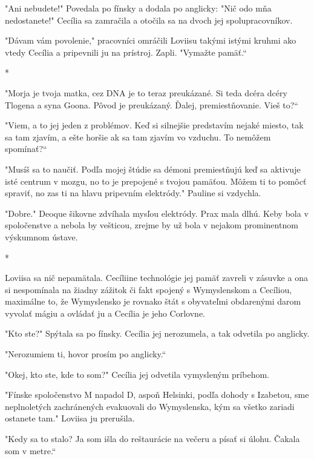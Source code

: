 \documentclass{book}
\begin{document}
"$ $Ani nebudete!"$ $ Povedala po fínsky a dodala po anglicky: "Nič odo mňa nedostanete!"$ $ Cecília sa zamračila a otočila sa na dvoch jej spolupracovníkov.

"Dávam vám povolenie,"$ $ pracovníci omráčili Loviisu takými istými kruhmi ako vtedy Cecília a pripevnili ju na prístroj. Zapli. "Vymažte pamäť.“

\begin{center}
*
\end{center}

"Morja je tvoja matka, cez DNA je to teraz preukázané. Si teda dcéra dcéry Tlogena a syna Goona. Pôvod je preukázaný. Ďalej, premiestňovanie. Vieš to?“

"Viem, a to jej jeden z problémov. Keď si silnejšie predstavím nejaké miesto, tak sa tam zjavím, a ešte horšie ak sa tam zjavím vo vzduchu. To nemôžem spomínať?“

"Musíš sa to naučiť. Podľa mojej štúdie sa démoni premiestňujú keď sa aktivuje isté centrum v mozgu, no to je prepojené s tvojou pamäťou. Môžem ti to pomôcť spraviť, no zas ti na hlavu pripevním elektródy."$ $ Pauline si vzdychla.

"Dobre."$ $ Deoque šikovne zdvíhala mysľou elektródy. Prax mala dlhú. Keby bola v spoločenstve a nebola by vešticou, zrejme by už bola v nejakom prominentnom výskumnom ústave.

\begin{center}
*
\end{center}

Loviisa sa nič nepamätala. Cecíliine technológie jej pamäť zavreli v zásuvke a ona si nespomínala na žiadny zážitok či fakt spojený s Wymyslenskom a Cecíliou, maximálne to, že Wymyslensko je rovnako štát s obyvateľmi obdarenými darom vyvolať mágiu a ovládať ju a Cecília je jeho Corlovne.

"Kto ste?"$ $ Spýtala sa po fínsky. Cecília jej nerozumela, a tak odvetila po anglicky.

"Nerozumiem ti, hovor prosím po anglicky.“

"$ $Okej, kto ste, kde to som?"$ $ Cecília jej odvetila vymysleným príbehom.

"Fínske spoločenstvo M napadol D, aspoň Helsinki, podľa dohody s Izabetou, sme neplnoletých zachránených evakuovali do Wymyslenska, kým sa všetko zariadi ostanete tam."$ $ Loviisa ju prerušila.

"Kedy sa to stalo? Ja som išla do reštaurácie na večeru a písať si úlohu. Čakala som v metre.“
\end{document}

